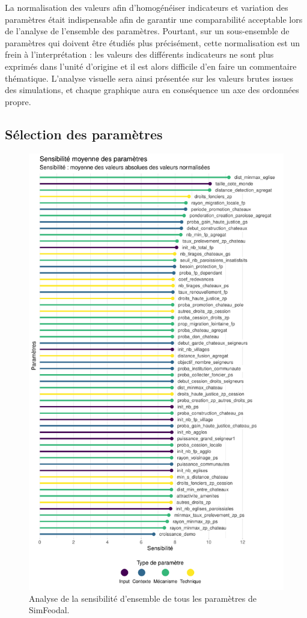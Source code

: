 La normalisation des valeurs afin d'homogénéiser indicateurs et variation des paramètres était indispensable afin de garantir une comparabilité acceptable lors de l'analyse de l'ensemble des paramètres.
Pourtant, sur un sous-ensemble de paramètres qui doivent être étudiés plus précisément, cette normalisation est un frein à l'interprétation : les valeurs des différents indicateurs ne sont plus exprimés dans l'unité d'origine et il est alors difficile d'en faire un commentaire thématique.
L'analyse visuelle sera ainsi présentée sur les valeurs brutes issues des simulations, et chaque graphique aura en conséquence un axe des ordonnées propre.

\subsection{Sélection des paramètres}

\begin{figure}[H]
	\centering
	\includegraphics[width=\linewidth]{img/sensibilite_globale.pdf}
	\caption{Analyse de la sensibilité d'ensemble de tous les paramètres de SimFeodal.}
	\label{fig:sensibilite-globale}
\end{figure}

